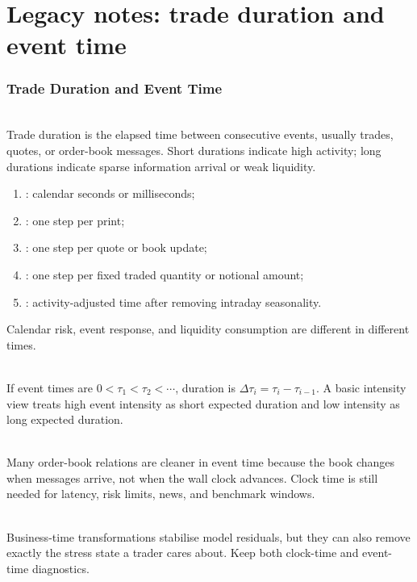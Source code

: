 \documentclass[a4paper,oneside,openany]{book}
\begin{document}
\chapter*{Legacy notes: trade duration and event time}

\subsection*{Trade Duration and Event Time}

\begin{definition} \\
Trade duration is the elapsed time between consecutive events, usually trades, quotes, or order-book messages. Short durations indicate high activity; long durations indicate sparse information arrival or weak liquidity.
\end{definition}

\begin{taxonomy} 
\begin{enumerate}[label=\roman*.]
\setlength{\itemsep}{0pt}
\item {}: calendar seconds or milliseconds;
\item {}: one step per print;
\item {}: one step per quote or book update;
\item {}: one step per fixed traded quantity or notional amount;
\item {}: activity-adjusted time after removing intraday seasonality.
\end{enumerate}
Calendar risk, event response, and liquidity consumption are different in different times.
\end{taxonomy}

\begin{model} \\
If event times are $0<\tau_1<\tau_2<\cdots$, duration is $\Delta \tau_i=\tau_i-\tau_{i-1}$. A basic intensity view treats high event intensity as short expected duration and low intensity as long expected duration.
\end{model}

\begin{principle} \\
Many order-book relations are cleaner in event time because the book changes when messages arrive, not when the wall clock advances. Clock time is still needed for latency, risk limits, news, and benchmark windows.
\end{principle}

\begin{caveat} \\
Business-time transformations stabilise model residuals, but they can also remove exactly the stress state a trader cares about. Keep both clock-time and event-time diagnostics.
\end{caveat}
\end{document}
